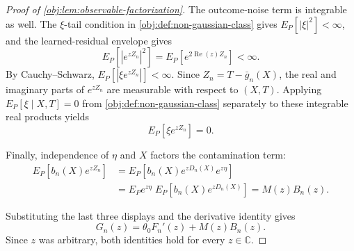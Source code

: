 \documentclass[11pt]{article}
\begin{document}
\begin{proof}[Proof of \cref{obj:lem:observable-factorization}]
The outcome-noise term is integrable as well.  The \(\xi\)-tail condition in \cref{obj:def:non-gaussian-class} gives \(E_P[|\xi|^2]<\infty\), and the learned-residual envelope gives
\[
E_P\!\left[\left|e^{zZ_n}\right|^2\right]
=E_P\!\left[e^{2\operatorname{Re}(z)Z_n}\right]<\infty.
\]
By Cauchy--Schwarz, \(E_P[|\xi e^{zZ_n}|]<\infty\). %
Since \(Z_n=T-\bar g_n(X)\), the real and imaginary parts of \(e^{zZ_n}\) are measurable with respect to \((X,T)\).  Applying \(E_P[\xi\mid X,T]=0\) from \cref{obj:def:non-gaussian-class} separately to these integrable real products yields
\[
E_P\!\left[\xi e^{zZ_n}\right]=0.
\]

Finally, independence of \(\eta\) and \(X\) factors the contamination term:
\[
\begin{aligned}
E_P\!\left[b_n(X)e^{zZ_n}\right]
&=E_P\!\left[b_n(X)e^{zD_n(X)}e^{z\eta}\right] \\
&=E_Pe^{z\eta}\;E_P\!\left[b_n(X)e^{zD_n(X)}\right]
=M(z)B_n(z).
\end{aligned}
\]

Substituting the last three displays and the derivative identity gives
\[
G_n(z)=\theta_0F_n'(z)+M(z)B_n(z).
\]
Since \(z\) was arbitrary, both identities hold for every \(z\in\mathbb C\). %
\end{proof}
\end{document}
